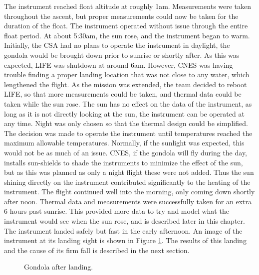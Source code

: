 The instrument reached float altitude at roughly 1am. Measurements were taken throughout the ascent, but proper measurements could now be taken for the duration of the float. The instrument operated without issue through the entire float period. At about 5:30am, the sun rose, and the instrument began to warm. Initially, the CSA had no plans to operate the instrument in daylight, the gondola would be brought down prior to sunrise or shortly after. As this was expected, LIFE was shutdown at around 6am. However, CNES was having trouble finding a proper landing location that was not close to any water, which lengthened the flight. As the mission was extended, the team decided to reboot LIFE, so that more measurements could be taken, and thermal data could be taken while the sun rose. The sun has no effect on the data of the instrument, as long as it is not directly looking at the sun, the instrument can be operated at any time. Night was only chosen so that the thermal design could be simplified. The decision was made to operate the instrument until temperatures reached the maximum allowable temperatures. Normally, if the sunlight was expected, this would not be as much of an issue. CNES, if the gondola will fly during the day, installs sun-shields to shade the instruments to minimize the effect of the sun, but as this was planned as only a night flight these were not added. Thus the sun shining directly on the instrument contributed significantly to the heating of the instrument. The flight continued well into the morning, only coming down shortly after noon. Thermal data and measurements were successfully taken for an extra 6 hours past sunrise. This provided more data to try and model what the instrument would see when the sun rose, and is described later in this chapter. The instrument landed safely but fast in the early afternoon. An image of the instrument at its landing sight is shown in Figure \ref{fig:gondola_after_landing}. The results of this landing and the cause of its firm fall is described in the next section.

\begin{figure}
    \centering
    \caption{Gondola after landing.}
    \label{fig:gondola_after_landing}
\end{figure}


